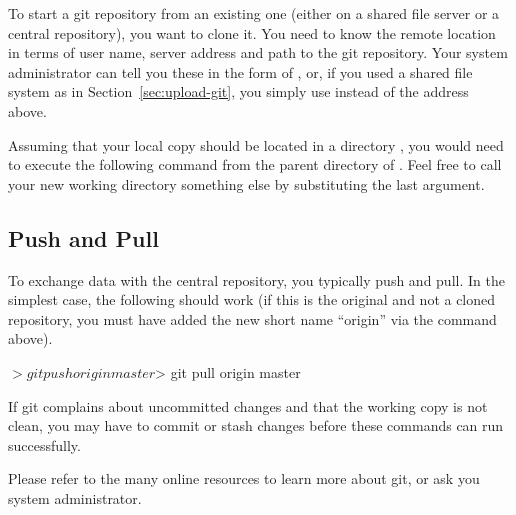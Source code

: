 To start a git repository from an existing one (either on a shared file server or a central repository), you want to clone it.  You need to know the remote location in terms of user name, server address and path to the git repository.  Your system administrator can tell you these in the form of , or, if you used a shared file system as in Section~\ref{sec:upload-git}, you simply use  instead of the address above. 

Assuming that your local copy should be located in a directory , you would need to execute the following command from the parent directory of .  Feel free to call your new working directory something else by substituting the last argument.

\subsection{Push and Pull}

To exchange data with the central repository, you typically push and pull.  In the simplest case, the following should work (if this is the original and not a cloned repository, you must have added the new short name ``origin'' via the  command above).
\begin{CodeVerbatim}
$> git push origin master
$> git pull origin master
\end{CodeVerbatim}

If git complains about uncommitted changes and that the working copy is not clean, you may have to commit or stash changes before these commands can run successfully.

Please refer to the many online resources to learn more about git, or ask you system administrator.

